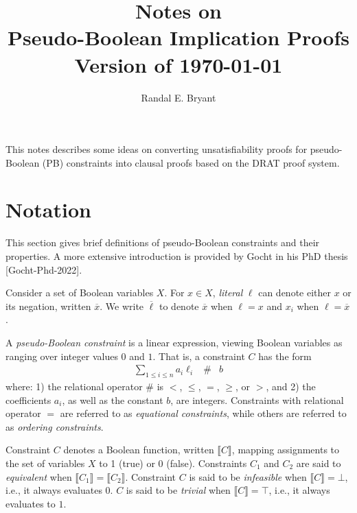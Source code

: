 \documentclass{easychair}
\title{Notes on \\ Pseudo-Boolean Implication Proofs \\ Version of \today}
\author{Randal E. Bryant}
\institute{
Computer Science Department \\
Carnegie Mellon University, Pittsburgh, PA, United States\\
\email{Randy.Bryant@cs.cmu.edu}
}
\renewcommand{\obar}[1]{\overline{#1}}
\newcommand{\lit}{\ell}
\newcommand{\func}[1]{\llbracket#1\rrbracket}
\begin{document}
\maketitle

This notes describes some ideas on converting unsatisfiability proofs
for pseudo-Boolean (PB) constraints into clausal proofs based on the
DRAT proof system.

\section{Notation}

This section gives brief definitions of pseudo-Boolean constraints and their properties.
A more extensive introduction is provided by Gocht in his PhD thesis [Gocht-Phd-2022].

Consider a set of Boolean variables $X$.  For $x \in X$, {\em literal}
$\lit$ can denote either $x$ or its negation, written $\obar{x}$.  We
write $\obar{\lit}$ to denote $\obar{x}$ when $\lit = x$ and $x_i$ when
$\lit = \obar{x}$.

A {\em pseudo-Boolean constraint} is a linear expression, viewing
Boolean variables as ranging over integer values $0$ and $1$.  That
is, 
a constraint $C$ has the form
\begin{eqnarray}
\sum_{1 \leq i \leq n} a_i \lit_i & \# & b \label{eqn:pbconstraint}
\end{eqnarray}
where: 1) the relational operator $\#$ is $<$, $\leq$, $=$, $\geq$, or
$>$, and 2) the coefficients $a_i$, as well as the constant $b$, are
integers.
Constraints with relational operator $=$ are referred to as {\em equational constraints},
while others are referred to as {\em ordering constraints}.

Constraint $C$ denotes a Boolean function, written
$\func{C}$, mapping assignments to the set of variables $X$ to 1
(true) or 0 (false).  Constraints $C_1$ and $C_2$ are said to {\em
  equivalent} when $\func{C_1} = \func{C_2}$.
Constraint $C$ is said to be {\em infeasible} when $\func{C} = \bot$, i.e., it always evaluates $0$.
$C$ is said to be {\em trivial} when $\func{C} = \top$, i.e., it always evaluates to $1$.
\end{document}
